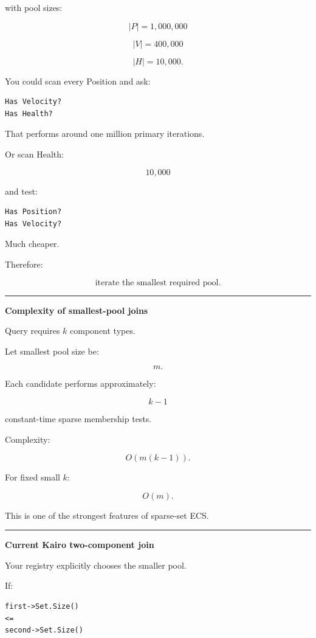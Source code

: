 with pool sizes:

\[
|P|=1,000,000
\]

\[
|V|=400,000
\]

\[
|H|=10,000.
\]

You could scan every Position and ask:

\begin{verbatim}
Has Velocity?
Has Health?
\end{verbatim}

That performs around one million primary iterations.

Or scan Health:

\[
10,000
\]

and test:

\begin{verbatim}
Has Position?
Has Velocity?
\end{verbatim}

Much cheaper.

Therefore:

\[
\boxed{
\text{iterate the smallest required pool}.
}
\]

\begin{center}\rule{0.5\linewidth}{0.5pt}\end{center}

\textbf{Complexity of smallest-pool joins}

Query requires \(k\) component types.

Let smallest pool size be:

\[
m.
\]

Each candidate performs approximately:

\[
k-1
\]

constant-time sparse membership tests.

Complexity:

\[
\boxed{
O(m(k-1)).
}
\]

For fixed small \(k\):

\[
O(m).
\]

This is one of the strongest features of sparse-set ECS.

\begin{center}\rule{0.5\linewidth}{0.5pt}\end{center}

\textbf{Current Kairo two-component join}

Your registry explicitly chooses the smaller pool.

If:

\begin{verbatim}
first->Set.Size()
<=
second->Set.Size()
\end{verbatim}

